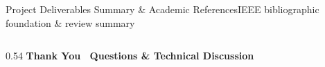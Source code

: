 \documentclass[aspectratio=169,10pt]{beamer}
\begin{document}
\begin{frame}{Project Deliverables Summary \& Academic References}{IEEE bibliographic foundation \& review summary}
\begin{columns}[T]
\begin{column}{0.54\textwidth}
            \vspace{0.08cm}
            \centering
            \textbf{\fontsize{6.5pt}{7.5pt}\selectfont\color{focusBlue}Thank You \textbar\ Questions \& Technical Discussion}
        \end{column}
    \end{columns}
\end{frame}
\end{document}
